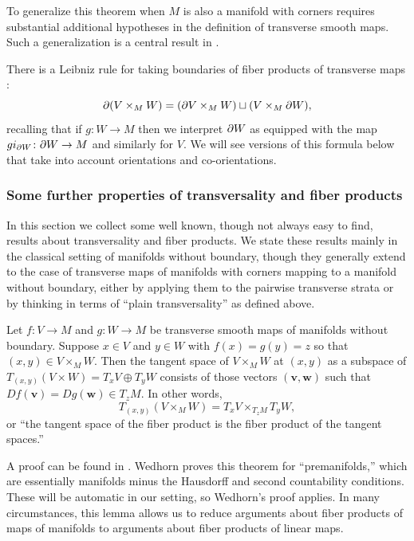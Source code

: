 To generalize this theorem when $M$ is also a manifold with corners requires substantial additional hypotheses in the definition of transverse smooth maps.
Such a generalization is a central result in \cite{Joy12}.

There is a Leibniz rule for taking boundaries of fiber products of transverse maps \cite[Proposition~6.7]{Joy12}:
\begin{equation}\label{E: product boundary}
	\partial(V\times_M W)=(\partial V \times_M W)\sqcup (V\times_M \partial W),
\end{equation}
recalling that if $g \colon W\to M$ then we interpret $\partial W$ as equipped with the map $gi_{\partial W} \colon \partial W\to M$ and similarly for $V$.
We will see versions of this formula below that take into account orientations and co-orientations.



\subsubsection{Some further properties of transversality and fiber products}

In this section we collect some well known, though not always easy to find, results about transversality and fiber products.
We state these results mainly in the classical setting of manifolds without boundary, though they generally extend to the case of transverse maps of manifolds with corners mapping to a manifold without boundary, either by applying them to the pairwise transverse strata or by thinking in terms of ``plain transversality'' as defined above.

\begin{lemma}\label{L: tangent of pullbacks}
	Let $f \colon V\to M$ and $g \colon W\to M$ be transverse smooth maps of manifolds without boundary.
	Suppose $x\in V$ and $y\in W$ with $f(x)=g(y)=z$ so that $(x,y)\in V\times_MW$.
	Then the tangent space of $V\times_MW$ at $(x,y)$ as a subspace of $T_{(x,y)}(V\times W)= T_xV\oplus T_yW$ consists of those vectors $(\mathbf v,\mathbf w)$ such that $Df(\mathbf v)=Dg(\mathbf w)\in T_zM$.
	In other words,
	$$T_{(x,y)}(V\times_MW)=T_xV\times_{T_zM}T_yW,$$
	or ``the tangent space of the fiber product is the fiber product of the tangent spaces.''
\end{lemma}

A proof can be found in \cite[Theorem 5.47]{Wed16}.
Wedhorn proves this theorem for ``premanifolds,'' which are essentially manifolds minus the Hausdorff and second countability conditions.
These will be automatic in our setting, so Wedhorn's proof applies.
In many circumstances, this lemma allows us to reduce arguments about fiber products of maps of manifolds to arguments about fiber products of linear maps.

